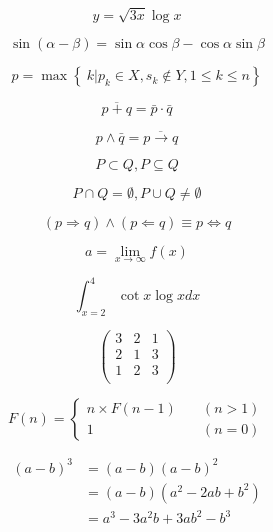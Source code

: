 \documentclass[a4j,twocolumn]{jarticle}
\begin{document}
\begin{equation}
  y = \sqrt{3x} \log x
\end{equation}

\begin{equation}
  \sin (\alpha - \beta) = \sin \alpha \cos \beta - \cos \alpha \sin \beta
\end{equation}

\begin{equation}
  p = \max\left\{\ k | p_k \in X,s_k \notin Y,1\leq k\leq n \right\}
\end{equation}

\begin{equation}
  \overline{p + q} = \bar{p} \cdot \bar{q}
\end{equation}

\begin{equation}
  p \wedge \bar{q} = \overline{p \rightarrow q}
\end{equation}

\begin{equation}
  P \subset Q, P\subseteq Q
\end{equation}

\begin{equation}
  P \cap Q = \emptyset, P \cup Q \neq \emptyset
\end{equation}

\begin{equation}
  \left( {p \Rightarrow q }\right) \wedge \left( {p \Leftarrow q }\right) \equiv p \Leftrightarrow q
\end{equation}

\begin{equation}
  a = \lim_{x \rightarrow \infty} f\left(x\right)
\end{equation}

\begin{equation}
  \int_{x=2}^{4} \cot x\log xdx
\end{equation}

\begin{equation}
  \begin{pmatrix}
    3 & 2 & 1\\
    2 & 1 & 3\\
    1 & 2 & 3\\
  \end{pmatrix}
\end{equation}

\begin{equation}
  F(n) = \left\{
    \begin{aligned}
      n \times F(n - 1) & \quad (n > 1) \\
      1 & \quad  (n = 0)
    \end{aligned}
  \right.
\end{equation}


\begin{equation}
  \begin{aligned}
    {(a - b)}^3 &= (a-b){(a-b)}^2 \\
    &= (a - b)(a^2 - 2ab + b^2)\\ 
    &= a^3 - 3a^2b + 3ab^2 - b^3

  \end{aligned}
\end{equation}
\end{document}
